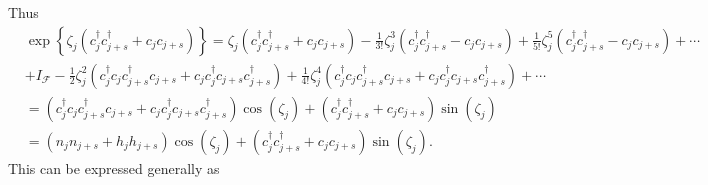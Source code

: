 \documentclass[aps, preprint]{revtex4}
\begin{document}
Thus
\begin{align} & \exp  \left \{\zeta _{j} \left (c_{j}^{ \dag } c_{j +s}^{ \dag } +c_{j} c_{j +s}\right )\right \} =\zeta _{j} \left (c_{j}^{ \dag } c_{j +s}^{ \dag } +c_{j} c_{j +s}\right ) -\frac{1}{3 !} \zeta _{j}^{3} \left (c_{j}^{ \dag } c_{j +s}^{ \dag } -c_{j} c_{j +s}\right ) +\frac{1}{5 !} \zeta _{j}^{5} \left (c_{j}^{ \dag } c_{j +s}^{ \dag } -c_{j} c_{j +s}\right ) +\cdots  \\
 &  +I_{\mathcal{F}} -\frac{1}{2} \zeta _{j}^{2} \left (c_{j}^{ \dag } c_{j} c_{j +s}^{ \dag } c_{j +s} +c_{j} c_{j}^{ \dag } c_{j +s} c_{j +s}^{ \dag }\right ) +\frac{1}{4 !} \zeta _{j}^{4} \left (c_{j}^{ \dag } c_{j} c_{j +s}^{ \dag } c_{j +s} +c_{j} c_{j}^{ \dag } c_{j +s} c_{j +s}^{ \dag }\right ) +\cdots  \\
 &  =\left (c_{j}^{ \dag } c_{j} c_{j +s}^{ \dag } c_{j +s} +c_{j} c_{j}^{ \dag } c_{j +s} c_{j +s}^{ \dag }\right ) \cos  \left (\zeta _{j}\right ) +\left (c_{j}^{ \dag } c_{j +s}^{ \dag } +c_{j} c_{j +s}\right ) \sin  \left (\zeta _{j}\right ) \\
 &  =\left (n_{j} n_{j +s} +h_{j} h_{j +s}\right ) \cos  \left (\zeta _{j}\right ) +\left (c_{j}^{ \dag } c_{j +s}^{ \dag } +c_{j} c_{j +s}\right ) \sin  \left (\zeta _{j}\right )\text{.}\end{align}This can be expressed generally as
\end{document}
